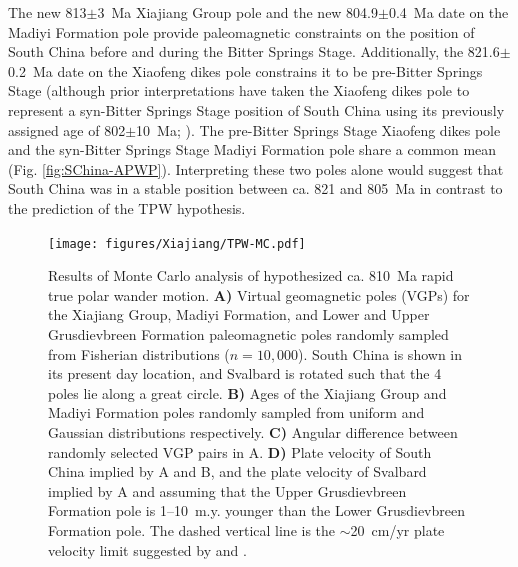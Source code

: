 The new 813$\pm$3~Ma Xiajiang Group pole and the new 804.9$\pm$0.4~Ma date on the Madiyi Formation pole provide paleomagnetic constraints on the position of South China before and during the Bitter Springs Stage. Additionally, the 821.6$\pm$0.2~Ma date on the Xiaofeng dikes pole constrains it to be pre-Bitter Springs Stage (although prior interpretations have taken the Xiaofeng dikes pole to represent a syn-Bitter Springs Stage position of South China using its previously assigned age of 802$\pm$10~Ma; \citealp{Maloof2006a, Jing2019a}). The pre-Bitter Springs Stage Xiaofeng dikes pole and the syn-Bitter Springs Stage Madiyi Formation pole share a common mean (Fig. \ref{fig:SChina-APWP}). Interpreting these two poles alone would suggest that South China was in a stable position between ca. 821 and 805~Ma in contrast to the prediction of the TPW hypothesis.

\begin{figure}[h!]
    \centering
    \texttt{[image: figures/Xiajiang/TPW-MC.pdf]}
    \caption[Results of Monte Carlo analysis of hypothesized ca. 810~Ma rapid true polar wander motion.]{Results of Monte Carlo analysis of hypothesized ca. 810~Ma rapid true polar wander motion. \textbf{A)} Virtual geomagnetic poles (VGPs) for the Xiajiang Group, Madiyi Formation, and Lower and Upper Grusdievbreen Formation paleomagnetic poles randomly sampled from Fisherian distributions ($n=10,000$). South China is shown in its present day location, and Svalbard is rotated such that the 4 poles lie along a great circle. \textbf{B)} Ages of the Xiajiang Group and Madiyi Formation poles randomly sampled from uniform and Gaussian distributions respectively. \textbf{C)} Angular difference between randomly selected VGP pairs in A. \textbf{D)} Plate velocity of South China implied by A and B, and the plate velocity of Svalbard implied by A and assuming that the Upper Grusdievbreen Formation pole is 1--10~m.y. younger than the Lower Grusdievbreen Formation pole. The dashed vertical line is the $\sim$20~cm/yr plate velocity limit suggested by \citet{Conrad2001a} and \citet{Zahirovic2015a}.}
    \label{fig:TPW-MC}
\end{figure}

